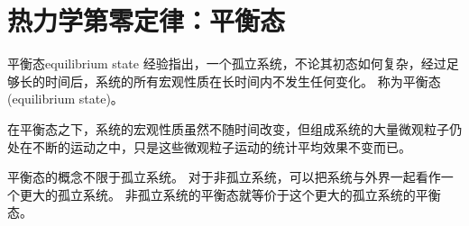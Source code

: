 \section{热力学第零定律：平衡态}

\begin{definition}
	{平衡态}{equilibrium state}
	经验指出，一个孤立系统，不论其初态如何复杂，经过足够长的时间后，系统的所有宏观性质在长时间内不发生任何变化。
	称为平衡态(equilibrium state)。
\end{definition}


\begin{remark}
	在平衡态之下，系统的宏观性质虽然不随时间改变，但组成系统的大量微观粒子仍处在不断的运动之中，只是这些微观粒子运动的统计平均效果不变而已。
\end{remark}

\begin{remark}
	平衡态的概念不限于孤立系统。
	对于非孤立系统，可以把系统与外界一起看作一个更大的孤立系统。
	非孤立系统的平衡态就等价于这个更大的孤立系统的平衡态。
\end{remark}


